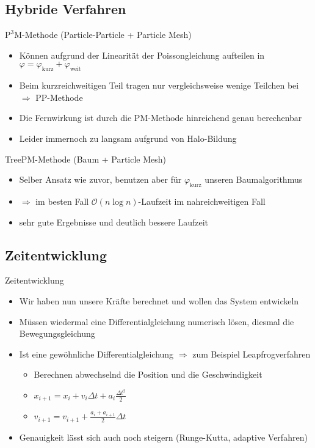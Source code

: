 \documentclass{beamer}
\begin{document}
\subsection{Hybride Verfahren}
\begin{frame}{$\text{P}^3\text{M}$-Methode (Particle-Particle + Particle Mesh)}
  \begin{itemize}
    \item Können aufgrund der Linearität der Poissongleichung aufteilen in 
      $\varphi = \varphi_{\text{kurz}} + \varphi_{\text{weit}}$
      \pause
    \item Beim kurzreichweitigen Teil tragen nur vergleichsweise wenige Teilchen bei
      $\Rightarrow$ PP-Methode 
    \item Die Fernwirkung ist durch die PM-Methode hinreichend genau berechenbar
      \pause
      \vskip10pt
    \item Leider immernoch zu langsam aufgrund von Halo-Bildung
  \end{itemize}
\end{frame}

\begin{frame}{TreePM-Methode (Baum + Particle Mesh)}
  \begin{itemize}
    \item Selber Ansatz wie zuvor, benutzen aber für $\varphi_{\text{kurz}}$
      unseren Baumalgorithmus
      \vskip20pt
    \item $\Rightarrow$ im besten Fall $\mathcal{O}(n\log n)$-Laufzeit im
      nahreichweitigen Fall \pause
    \item sehr gute Ergebnisse und deutlich bessere Laufzeit
  \end{itemize}
\end{frame}

\subsection*{Zeitentwicklung}
\begin{frame}{Zeitentwicklung}
  \begin{itemize}
    \item<+-> Wir haben nun unsere Kräfte berechnet und wollen das System entwickeln
    \item<+-> Müssen wiedermal eine Differentialgleichung numerisch lösen, diesmal
      die Bewegungsgleichung
    \item<+-> Ist eine gewöhnliche Differentialgleichung $\Rightarrow$ zum Beispiel
      Leapfrogverfahren
      \begin{itemize}
        \item<+-> Berechnen abwechselnd die Position und die Geschwindigkeit
        \item<+-> $x_{i+1} = x_i + v_{i}\Delta t + a_i\frac{\Delta t^2}{2}$
        \item<+-> $v_{i+1} = v_{i+1} + \frac{a_i + a_{i+1}}{2}\Delta t$
      \end{itemize}
    \item<+-> Genauigkeit lässt sich auch noch steigern (Runge-Kutta, adaptive
      Verfahren)
  \end{itemize}
\end{frame}
\end{document}
